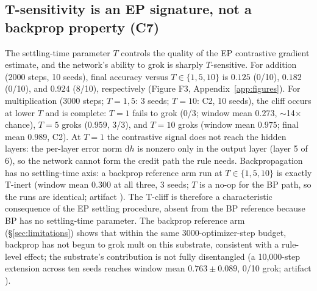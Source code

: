 \documentclass[11pt]{article}
\begin{document}
\subsection{T-sensitivity is an EP signature, not a backprop property (C7)}\label{sec:tcliff}
The settling-time parameter $T$ controls the quality of the EP contrastive gradient estimate, and the network's ability to grok is sharply $T$-sensitive. For addition (2000 steps, 10 seeds), final accuracy versus $T \in \{1, 5, 10\}$ is $0.125$ (0/10), $0.182$ (0/10), and $0.924$ (8/10), respectively (Figure F3, Appendix~\ref{app:figures}). For multiplication (3000 steps; $T{=}1,5$: 3 seeds; $T{=}10$: C2, 10 seeds), the cliff occurs at lower $T$ and is complete: $T{=}1$ fails to grok (0/3; window mean $0.273$, $\sim$14$\times$ chance), $T{=}5$ groks ($0.959$, 3/3), and $T{=}10$ groks (window mean $0.975$; final mean $0.989$, C2). At $T{=}1$ the contrastive signal does not reach the hidden layers: the per-layer error norm $\mathrm{d}h$ is nonzero only in the output layer (layer 5 of 6), so the network cannot form the credit path the rule needs. Backpropagation has no settling-time axis: a backprop reference arm run at $T \in \{1,5,10\}$ is exactly T-inert (window mean $0.300$ at all three, 3 seeds; $T$ is a no-op for the BP path, so the runs are identical; artifact \texttt{}). The T-cliff is therefore a characteristic consequence of the EP settling procedure, absent from the BP reference because BP has no settling-time parameter. The backprop reference arm (\S\ref{sec:limitations}) shows that within the same 3000-optimizer-step budget, backprop has not begun to grok mult on this substrate, consistent with a rule-level effect; the substrate's contribution is not fully disentangled (a 10{,}000-step extension across ten seeds reaches window mean $0.763 \pm 0.089$, 0/10 grok; artifact \texttt{}).
\end{document}
